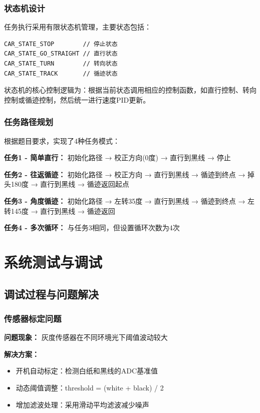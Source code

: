 \documentclass[UTF8]{ctexart}
\begin{document}
\subsubsection{状态机设计}

任务执行采用有限状态机管理，主要状态包括：

\begin{verbatim}
CAR_STATE_STOP        // 停止状态
CAR_STATE_GO_STRAIGHT // 直行状态  
CAR_STATE_TURN        // 转向状态
CAR_STATE_TRACK       // 循迹状态
\end{verbatim}

状态机的核心控制逻辑为：根据当前状态调用相应的控制函数，如直行控制、转向控制或循迹控制，然后统一进行速度PID更新。

\subsubsection{任务路径规划}

根据题目要求，实现了4种任务模式：

\textbf{任务1 - 简单直行：}
初始化路径 → 校正方向(0度) → 直行到黑线 → 停止

\textbf{任务2 - 往返循迹：}
初始化路径 → 校正方向 → 直行到黑线 → 循迹到终点 → 掉头180度 → 直行到黑线 → 循迹返回起点

\textbf{任务3 - 角度循迹：}
初始化路径 → 左转35度 → 直行到黑线 → 循迹到终点 → 左转145度 → 直行到黑线 → 循迹返回

\textbf{任务4 - 多次循环：}
与任务3相同，但设置循环次数为4次

\section{系统测试与调试}

\subsection{调试过程与问题解决}

\subsubsection{传感器标定问题}

\textbf{问题现象：} 灰度传感器在不同环境光下阈值波动较大

\textbf{解决方案：}
\begin{itemize}
    \item 开机自动标定：检测白纸和黑线的ADC基准值
    \item 动态阈值调整：threshold = (white + black) / 2
    \item 增加滤波处理：采用滑动平均滤波减少噪声
\end{itemize}
\end{document}
